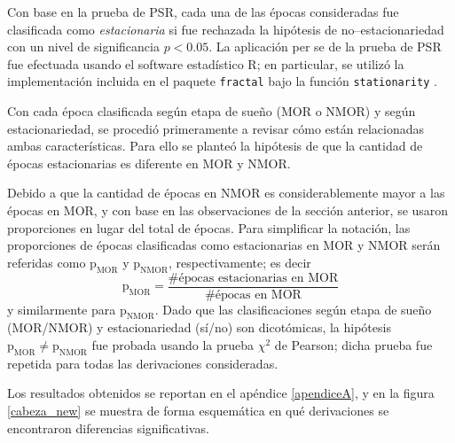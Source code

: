 \documentclass[12pt,letterpaper]{book}
\begin{document}
Con base en la prueba de PSR, cada una de las épocas consideradas fue clasificada como \textit{estacionaria} si fue rechazada la hipótesis de no--estacionariedad con un nivel de significancia $p<0.05$.
%
La aplicación per se de la prueba de PSR fue efectuada usando el software estadístico R; en particular, se utilizó la implementación incluida en el paquete \texttt{fractal} bajo la función \texttt{stationarity} \cite{R_fractal}.

Con cada época clasificada según etapa de sueño (MOR o NMOR) y según estacionariedad, se procedió primeramente a revisar cómo están relacionadas ambas características.
%
Para ello se planteó la hipótesis de que la cantidad de épocas estacionarias es diferente en MOR y NMOR. 

Debido a que la cantidad de épocas en NMOR es considerablemente mayor a las épocas en MOR, y con base en las observaciones de la sección anterior, se usaron proporciones en lugar del total de épocas.
%
Para simplificar la notación, las proporciones de épocas clasificadas como estacionarias en MOR y NMOR serán referidas como $\text{p}_{\text{MOR}}$ y $\text{p}_{\text{NMOR}}$, respectivamente; es decir
\begin{equation}
\text{p}_{\text{MOR}} = \frac{\text{\# épocas estacionarias en MOR}}{\text{\# épocas en MOR}}
\end{equation}
y similarmente para $\text{p}_{\text{NMOR}}$.
%
Dado que las clasificaciones según etapa de sueño (MOR/NMOR) y estacionariedad (sí/no) son dicotómicas, la hipótesis $\text{p}_{\text{MOR}}\neq\text{p}_{\text{NMOR}}$ fue probada usando la prueba $\chi^{2}$ de Pearson; dicha prueba fue repetida para todas las derivaciones consideradas.

Los resultados obtenidos se reportan en el apéndice \ref{apendiceA}, y en la figura \ref{cabeza_new} se muestra de forma esquemática en qué derivaciones se encontraron diferencias significativas.
\end{document}
